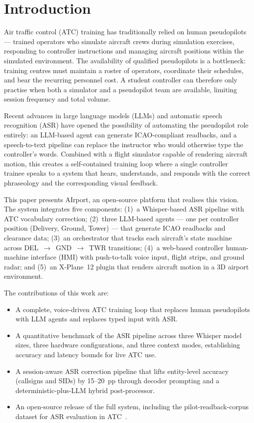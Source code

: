 \documentclass[computers,article,submit,moreauthors,pdftex]{Definitions/mdpi}
\begin{document}
\section{Introduction}
\label{sec:introduction}

Air traffic control (ATC) training has traditionally relied on human
pseudopilots — trained operators who simulate aircraft crews during simulation
exercises, responding to controller instructions and managing aircraft positions
within the simulated environment. The availability of qualified pseudopilots is
a bottleneck: training centres must maintain a roster of operators, coordinate
their schedules, and bear the recurring personnel cost. A student controller can
therefore only practise when both a simulator and a pseudopilot team are
available, limiting session frequency and total volume.

Recent advances in large language models (LLMs) and automatic speech recognition
(ASR) have opened the possibility of automating the pseudopilot role entirely:
an LLM-based agent can generate ICAO-compliant readbacks, and a speech-to-text
pipeline can replace the instructor who would otherwise type the controller's
words. Combined with a flight simulator capable of rendering aircraft motion,
this creates a self-contained training loop where a single controller trainee
speaks to a system that hears, understands, and responds with the correct
phraseology and the corresponding visual feedback.

This paper presents AIrport, an open-source platform that realises this vision.
The system integrates five components: (1)~a Whisper-based ASR pipeline with ATC
vocabulary correction; (2)~three LLM-based agents — one per controller position
(Delivery, Ground, Tower) — that generate ICAO readbacks and clearance data;
(3)~an orchestrator that tracks each aircraft's state machine across
DEL~$\rightarrow$~GND~$\rightarrow$~TWR transitions; (4)~a web-based controller
human-machine interface (HMI) with push-to-talk voice input, flight strips, and
ground radar; and (5)~an X-Plane~12 plugin that renders aircraft motion in a 3D
airport environment.

The contributions of this work are:
\begin{itemize}
    \item A complete, voice-driven ATC training loop that replaces human
          pseudopilots with LLM agents and replaces typed input with ASR.
    \item A quantitative benchmark of the ASR pipeline across three Whisper
          model sizes, three hardware configurations, and three context modes,
          establishing accuracy and latency bounds for live ATC use.
    \item A session-aware ASR correction pipeline that lifts entity-level
          accuracy (callsigns and SIDs) by 15--20~pp through decoder prompting
          and a deterministic-plus-LLM hybrid post-processor.
    \item An open-source release of the full system, including the
          pilot-readback-corpus dataset for ASR evaluation in ATC~\cite{SoutoReadbackCorpus2024}.
\end{itemize}
\end{document}
